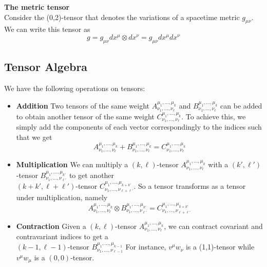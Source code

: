 \documentclass{article}
\begin{document}
 			\pagebreak
 			
 			\begin{exmp}
 				\textbf{The metric tensor}\\
 				Consider the (0,2)-tensor that denotes the variations of a spacetime metric $g_{\mu\nu}$. We can write this tensor as
 				\begin{equation}
 					\label{eq:MetricTensor}
 					\boxed{g = g_{\mu\nu} dx^\mu \otimes dx^\nu = g_{\mu \nu} dx^\mu dx^\nu}
 				\end{equation}
 			\end{exmp}
 			
 			\subsection{Tensor Algebra}
 			We have the following operations on tensors:
 			\begin{itemize}
 				\item \textbf{Addition}
 					\subitem Two tensors of the same weight $A_{\nu_1, \dots, \nu_\ell}^{\mu_1, \dots, \mu_k}$ and $B_{\nu_1, \dots, \nu_\ell}^{\mu_1, \dots, \mu_k}$ can be added to obtain another tensor of the same weight $C_{\nu_1, \dots, \nu_\ell}^{\mu_1, \dots, \mu_k}$. To achieve this, we simply add the components of each vector correspondingly to the indices such that we get
 					$$ A_{\nu_1, \dots, \nu_\ell}^{\mu_1, \dots, \mu_k} + B_{\nu_1, \dots, \nu_\ell}^{\mu_1, \dots, \mu_k} = C_{\nu_1, \dots, \nu_\ell}^{\mu_1, \dots, \mu_k}$$
 				\item \textbf{Multiplication}
 					\subitem We can multiply a $(k, \ell)$-tensor $A_{\nu_1, \dots, \nu_\ell}^{\mu_1, \dots, \mu_k}$ with a $(k', \ell')$-tensor $B_{\nu_1, \dots, \nu_{\ell'}}^{\mu_1, \dots, \mu_{k'}}$  to get another\\$(k+k',\ell + \ell')$-tensor $C_{\nu_1, \dots, \nu_{\ell+\ell'}}^{\mu_1, \dots, \mu_{k+k'}}$. So a tensor transforms as a tensor under multiplication, namely
 					$$ A_{\nu_1, \dots, \nu_\ell}^{\mu_1, \dots, \mu_k}\otimes B_{\nu_1, \dots, \nu_{\ell'}}^{\mu_1, \dots, \mu_{k'}} = C_{\nu_1, \dots, \nu_{\ell+\ell'}}^{\mu_1, \dots, \mu_{k+k'}}$$
 				\item \textbf{Contraction}
 					\subitem Given a $(k, \ell)$-tensor $A_{\nu_1, \dots, \nu_\ell}^{\mu_1, \dots, \mu_k}$, we can contract covariant and contravariant indices to get a \\$(k-1, \ell-1)$-tensor  $B_{\nu_1, \dots, \nu_{\ell-1}}^{\mu_1, \dots, \mu_{k-1}}$
 					For instance, $v^\mu w_\nu$ is a (1,1)-tensor while $v^\mu w_\mu$ is a $(0,0)$-tensor.
 			\end{itemize}
\end{document}

